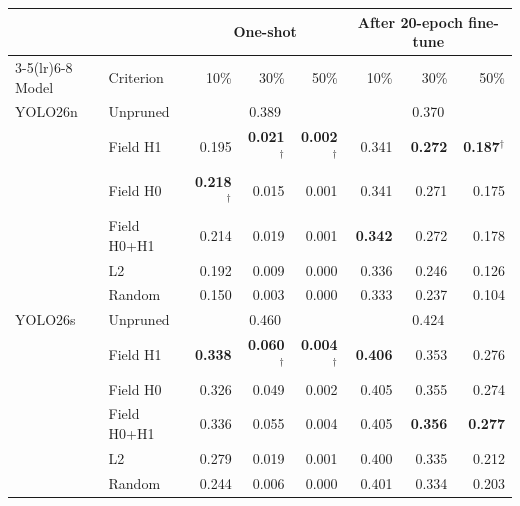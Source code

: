 \begin{tabular}{llrrrrrr}
\toprule
 & & \multicolumn{3}{c}{One-shot} & \multicolumn{3}{c}{After 20-epoch fine-tune} \\
\cmidrule(lr){3-5}\cmidrule(lr){6-8}
Model & Criterion & 10\% & 30\% & 50\% & 10\% & 30\% & 50\% \\
\midrule
YOLO26n & Unpruned & \multicolumn{3}{c}{0.389} & \multicolumn{3}{c}{0.370} \\
 & Field H1 & 0.195 & \textbf{0.021}$^\dagger$ & \textbf{0.002}$^\dagger$ & 0.341 & \textbf{0.272} & \textbf{0.187}$^\dagger$ \\
 & Field H0 & \textbf{0.218}$^\dagger$ & 0.015 & 0.001 & 0.341 & 0.271 & 0.175 \\
 & Field H0+H1 & 0.214 & 0.019 & 0.001 & \textbf{0.342} & 0.272 & 0.178 \\
 & L2 & 0.192 & 0.009 & 0.000 & 0.336 & 0.246 & 0.126 \\
 & Random & 0.150 & 0.003 & 0.000 & 0.333 & 0.237 & 0.104 \\
\midrule
YOLO26s & Unpruned & \multicolumn{3}{c}{0.460} & \multicolumn{3}{c}{0.424} \\
 & Field H1 & \textbf{0.338} & \textbf{0.060}$^\dagger$ & \textbf{0.004}$^\dagger$ & \textbf{0.406} & 0.353 & 0.276 \\
 & Field H0 & 0.326 & 0.049 & 0.002 & 0.405 & 0.355 & 0.274 \\
 & Field H0+H1 & 0.336 & 0.055 & 0.004 & 0.405 & \textbf{0.356} & \textbf{0.277} \\
 & L2 & 0.279 & 0.019 & 0.001 & 0.400 & 0.335 & 0.212 \\
 & Random & 0.244 & 0.006 & 0.000 & 0.401 & 0.334 & 0.203 \\
\bottomrule
\end{tabular}
